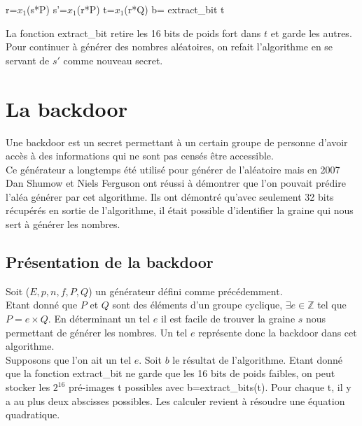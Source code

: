 \documentclass[a4paper,11pt]{report}
\begin{document}
		
							
		\begin{algorithm}[H]
		r=$x_1$(s*P)\;
		s'=$x_1$(r*P)\;
		t=$x_1$(r*Q)\;
		b= extract\_bit t\;
		\caption{Algorithme donn\'e par le NIST}
		\end{algorithm}
		
		
		
		La fonction extract\_bit retire les 16 bits de poids fort dans $t$ et garde les autres. %
		Pour continuer \`a g\'en\'erer des nombres al\'eatoires, on refait l'algorithme en se servant %
		de $s'$ comme nouveau secret.\\
		
	
	\chapter{La backdoor}
	Une backdoor est un secret permettant \`a un certain groupe de personne d'avoir acc\`es \`a %
	des informations qui ne sont pas cens\'es \^etre accessible.\\
	Ce g\'en\'erateur a longtemps \'et\'e utilis\'e pour g\'en\'erer de l'al\'eatoire mais en 2007 Dan Shumow et %
	Niels Ferguson ont r\'eussi \`a d\'emontrer que l'on pouvait pr\'edire l'al\'ea g\'en\'erer par cet %
	algorithme. Ils ont d\'emontr\'e qu'avec seulement 32 bits r\'ecup\'er\'es en sortie de l'algorithme, %
	il \'etait possible d'identifier la graine qui nous sert \`a g\'en\'erer les nombres.
	
	\section{Pr\'esentation de la backdoor}
	
	Soit ($E,p,n,f,P,Q$) un g\'en\'erateur d\'efini comme pr\'ec\'edemment. \\
	Etant donn\'e que $P$ et $Q$ sont des \'el\'ements d'un groupe cyclique, %
	 $\exists e \in \mathbb{Z}$ %
	tel que $P = e \times Q$. En d\'eterminant un tel $e$ il est facile de trouver la graine $s$ %
	nous permettant de g\'en\'erer les nombres. Un tel $e$ repr\'esente donc la backdoor dans cet %
	algorithme.\\
	
	Supposons que l'on ait un tel $e$. Soit $b$ le r\'esultat de l'algorithme. Etant donn\'e que la %
	fonction extract\_bit ne garde que les 16 bits de poids faibles, on peut stocker les %
	$2^{16}$ pr\'e-images t possibles avec b=extract\_bits(t). Pour chaque t, il y a au plus deux %
	abscisses possibles. Les calculer revient \`a r\'esoudre une \'equation quadratique. \\
	
\end{document}
